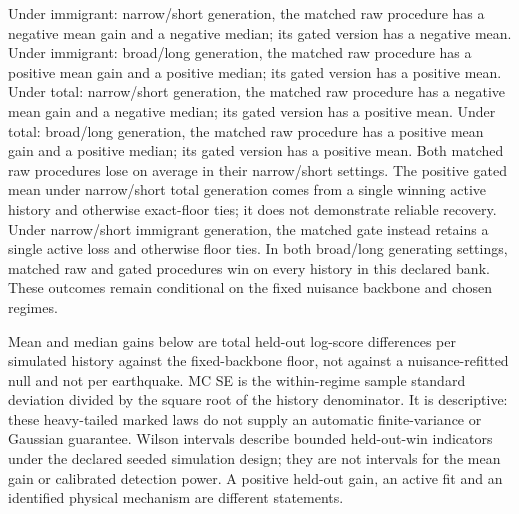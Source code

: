 Under immigrant: narrow/short generation, the matched raw procedure has a negative mean gain and a negative median; its gated version has a negative mean. Under immigrant: broad/long generation, the matched raw procedure has a positive mean gain and a positive median; its gated version has a positive mean. Under total: narrow/short generation, the matched raw procedure has a negative mean gain and a negative median; its gated version has a positive mean. Under total: broad/long generation, the matched raw procedure has a positive mean gain and a positive median; its gated version has a positive mean. Both matched raw procedures lose on average in their narrow/short settings. The positive gated mean under narrow/short total generation comes from a single winning active history and otherwise exact-floor ties; it does not demonstrate reliable recovery. Under narrow/short immigrant generation, the matched gate instead retains a single active loss and otherwise floor ties. In both broad/long generating settings, matched raw and gated procedures win on every history in this declared bank. These outcomes remain conditional on the fixed nuisance backbone and chosen regimes.

Mean and median gains below are total held-out log-score differences per simulated history against the fixed-backbone floor, not against a nuisance-refitted null and not per earthquake. MC SE is the within-regime sample standard deviation divided by the square root of the history denominator. It is descriptive: these heavy-tailed marked laws do not supply an automatic finite-variance or Gaussian guarantee. Wilson intervals describe bounded held-out-win indicators under the declared seeded simulation design; they are not intervals for the mean gain or calibrated detection power. A positive held-out gain, an active fit and an identified physical mechanism are different statements.

\clearpage
\begingroup\footnotesize\setlength{\tabcolsep}{3pt}

